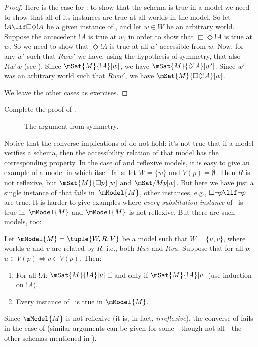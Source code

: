 \documentclass[../../../include/open-logic-section]{subfiles}
\begin{document}
\begin{proof}
  Here is the case for : to show that the schema is true in a
  model we need to show that all of its instances are true at all worlds
  in the model. So let $!A \lif \Box\Diamond !A$ be a given instance
  of , and let $w \in W$ be an arbitrary world. Suppose the
  antecedent $!A$ is true at $w$, in order to show that $\Box \Diamond
  !A$ is true at $w$. So we need to show that $\Diamond !A$ is true at
  all $w'$ accessible from $w$. Now, for any $w'$ such that $Rww'$ we
  have, using the hypothesis of symmetry, that also $Rw'w$ (see
  ). Since $\mSat{M}{!A}[w]$, we have
  $\mSat{M}{\Diamond !A}[w']$. Since $w'$ was an arbitrary world such
  that $Rww'$, we have $\mSat{M}{\Box\Diamond!A}[w]$.

  We leave the other cases as exercises.
\end{proof}

\begin{prob}
  Complete the proof of .
\end{prob}

\begin{figure}
\centering
{}
\caption{The argument from symmetry.}
\end{figure}

Notice that the converse implications of  do
not hold: it's not true that if a model verifies a schema, then the
accessibility relation of that model has the corresponding property.
In the case of  and reflexive models, it is easy to give an
example of a model in which  itself fails: let $W = \{w\}$ and
$V(p) = \emptyset$. Then $R$ is not reflexive, but $\mSat{M}{\Box
  p}[w]$ and $\mSat/{M}{p}[w]$. But here we have just a single
instance of  that fails in~$\mModel{M}$, other instances, e.g.,
$\Box \lnot p \lif \lnot p$ are true. It is harder to give examples
where \emph{every substitution instance} of~ is true
in~$\mModel{M}$ and $\mModel{M}$ is not reflexive. But there are such
models, too:

\begin{prop}
  Let $\mModel{M} = \tuple{W, R, V}$ be a model such that $W = \{u, v
  \}$, where worlds $u$ and $v$ are related by $R$: i.e., both $Ruv$
  and $Rvu$.  Suppose that for all $p$: $u \in V(p) \Leftrightarrow v
  \in V(p)$. Then:
  \begin{enumerate}
  \item For all $!A$: $\mSat{M}{!A}[u]$ if and only if
    $\mSat{M}{!A}[v]$ (use induction on $!A$).
  \item Every instance of~ is true in $\mModel{M}$.
  \end{enumerate}
  Since $\mModel{M}$ is not reflexive (it is, in fact,
  \emph{irreflexive}), the converse of 
  fails in the case of  (similar arguments can be given for
  some---though not all---the other schemas mentioned in
  ).
\end{prop}
\end{document}
